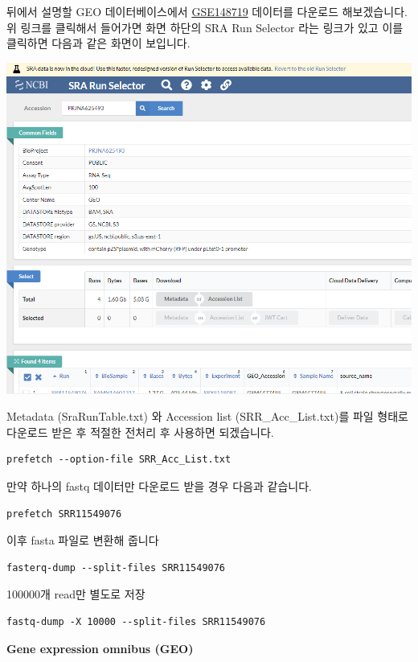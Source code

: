 \documentclass[
]{book}
\begin{document}
뒤에서 설명할 GEO 데이터베이스에서 \href{https://www.ncbi.nlm.nih.gov/geo/query/acc.cgi?acc=GSE148719}{GSE148719} 데이터를 다운로드 해보겠습니다. 위 링크를 클릭해서 들어가면 화면 하단의 SRA Run Selector 라는 링크가 있고 이를 클릭하면 다음과 같은 화면이 보입니다.

\includegraphics[width=6.25in,height=\textheight]{images/sra.PNG}

Metadata (SraRunTable.txt) 와 Accession list (SRR\_Acc\_List.txt)를 파일 형태로 다운로드 받은 후 적절한 전처리 후 사용하면 되겠습니다.

\begin{verbatim}
prefetch --option-file SRR_Acc_List.txt
\end{verbatim}

만약 하나의 fastq 데이터만 다운로드 받을 경우 다음과 같습니다.

\begin{verbatim}
prefetch SRR11549076
\end{verbatim}

이후 fasta 파일로 변환해 줍니다

\begin{verbatim}
fasterq-dump --split-files SRR11549076
\end{verbatim}

100000개 read만 별도로 저장

\begin{verbatim}
fastq-dump -X 10000 --split-files SRR11549076
\end{verbatim}

\textbf{Gene expression omnibus (GEO)}
\end{document}
